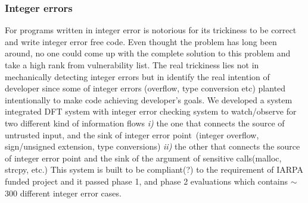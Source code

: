 \documentclass[letterpaper, 10pt]{article}
\begin{document}
\begin{small}
\subsubsection*{Integer errors}

For programs written in integer error is notorious for its trickiness to be
correct and write integer error free code. Even thought the problem has long
been around, no one could come up with the complete solution to this problem
and take a high rank from vulnerability list.
%
The real trickiness lies not in mechanically detecting integer errors but in
identify the real intention of developer since some of integer errors
(overflow, type conversion etc) planted intentionally to make code achieving
developer's goals.
%
We developed a system integrated DFT system with integer error checking system
to watch/observe for two different kind of information flows {\it i)} the one
that connects the source of untrusted input, and the sink of integer error
point~(integer overflow, sign/unsigned extension, type conversions) {\it ii)}
the other that connects the source of integer error point and the sink of the
argument of sensitive calls(malloc, strcpy, etc.)
%
This system is built to be compliant(?) to the requirement of IARPA funded
project and it passed phase 1, and phase 2 evaluations which contains $\sim$
300 different integer error cases.

\end{small}
\newpage



\end{document}
